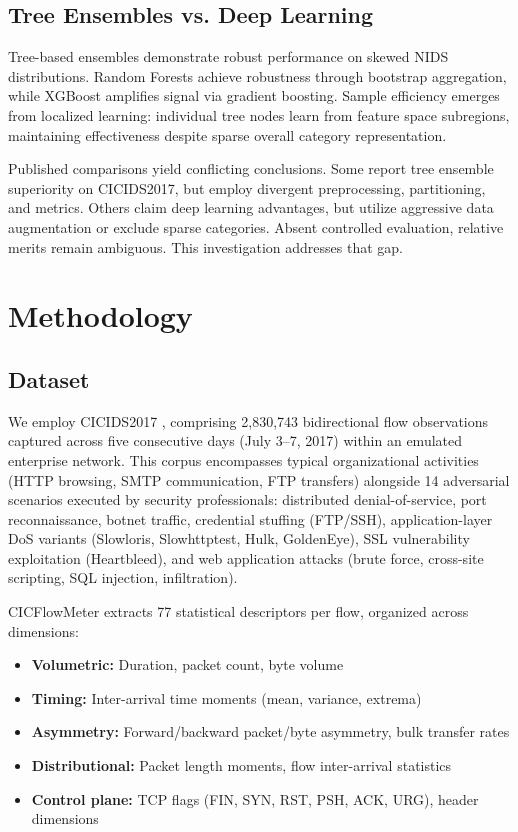 \documentclass[10pt,twocolumn]{article}
\begin{document}
\subsection{Tree Ensembles vs. Deep Learning}

Tree-based ensembles demonstrate robust performance on skewed NIDS distributions. Random Forests achieve robustness through bootstrap aggregation, while XGBoost amplifies signal via gradient boosting. Sample efficiency emerges from localized learning: individual tree nodes learn from feature space subregions, maintaining effectiveness despite sparse overall category representation.

Published comparisons yield conflicting conclusions. Some report tree ensemble superiority on CICIDS2017, but employ divergent preprocessing, partitioning, and metrics. Others claim deep learning advantages, but utilize aggressive data augmentation or exclude sparse categories. Absent controlled evaluation, relative merits remain ambiguous. This investigation addresses that gap.


\section{Methodology}

\subsection{Dataset}

We employ CICIDS2017 \cite{sharafaldin2018cicids}, comprising 2,830,743 bidirectional flow observations captured across five consecutive days (July 3--7, 2017) within an emulated enterprise network. This corpus encompasses typical organizational activities (HTTP browsing, SMTP communication, FTP transfers) alongside 14 adversarial scenarios executed by security professionals: distributed denial-of-service, port reconnaissance, botnet traffic, credential stuffing (FTP/SSH), application-layer DoS variants (Slowloris, Slowhttptest, Hulk, GoldenEye), SSL vulnerability exploitation (Heartbleed), and web application attacks (brute force, cross-site scripting, SQL injection, infiltration).

CICFlowMeter extracts 77 statistical descriptors per flow, organized across dimensions:
\begin{itemize}
    \item \textbf{Volumetric:} Duration, packet count, byte volume
    \item \textbf{Timing:} Inter-arrival time moments (mean, variance, extrema)
    \item \textbf{Asymmetry:} Forward/backward packet/byte asymmetry, bulk transfer rates
    \item \textbf{Distributional:} Packet length moments, flow inter-arrival statistics
    \item \textbf{Control plane:} TCP flags (FIN, SYN, RST, PSH, ACK, URG), header dimensions
\end{itemize}
\end{document}
